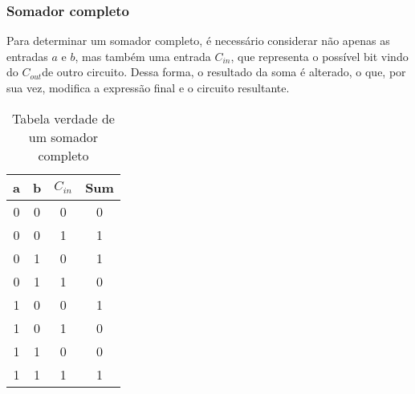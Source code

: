 \begin{frame}
	\frametitle{Somador completo}
	\par Para determinar um somador completo, é necessário considerar não apenas as entradas $a$ e $b$, mas também uma entrada $C_{in}$​, que representa o possível bit vindo do $C_{out}$​ de outro circuito. Dessa forma, o resultado da soma é alterado, o que, por sua vez, modifica a expressão final e o circuito resultante.
	\begin{table}[h!]
		\centering
		\begin{tabular}{|c|c|c|c|}
			\hline
			a & b & $C_{in}$ & Sum \\
			\hline
			0 & 0 & 0 & 0 \\
			0 & 0 & 1 & 1 \\
			0 & 1 & 0 & 1 \\
			0 & 1 & 1 & 0 \\
			1 & 0 & 0 & 1 \\
			1 & 0 & 1 & 0 \\
			1 & 1 & 0 & 0 \\
			1 & 1 & 1 & 1 \\
			\hline
		\end{tabular}
		\caption{Tabela verdade de um somador completo}
		\label{tab:full_adder}
	\end{table}
\end{frame}

